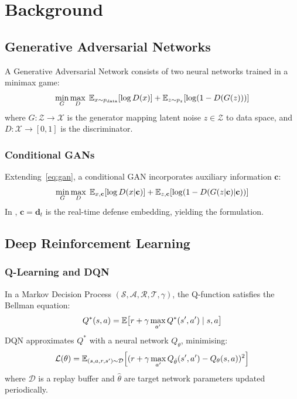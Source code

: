\chapter{Background}
\label{ch:background}

\section{Generative Adversarial Networks}

A Generative Adversarial Network \citep{goodfellow2014} consists of two
neural networks trained in a minimax game:
\begin{equation}
  \min_G \max_D\; \mathbb{E}_{x \sim p_{\mathrm{data}}}[\log D(x)]
    + \mathbb{E}_{z \sim p_z}[\log(1 - D(G(z)))]
  \label{eq:gan}
\end{equation}
where $G: \mathcal{Z} \to \mathcal{X}$ is the generator mapping latent noise
$z \in \mathcal{Z}$ to data space, and $D: \mathcal{X} \to [0,1]$ is the
discriminator.

\subsection{Conditional GANs}
Extending~\eqref{eq:gan}, a conditional GAN \citep{mirza2014} incorporates
auxiliary information $\mathbf{c}$:
\begin{equation}
  \min_G \max_D\; \mathbb{E}_{x,\mathbf{c}}[\log D(x|\mathbf{c})]
    + \mathbb{E}_{z,\mathbf{c}}[\log(1 - D(G(z|\mathbf{c})|\mathbf{c}))]
\end{equation}
In \caesar{}, $\mathbf{c} = \mathbf{d}_t$ is the real-time defense embedding,
yielding the \tagan{} formulation.

\section{Deep Reinforcement Learning}

\subsection{Q-Learning and DQN}
In a Markov Decision Process $(\mathcal{S}, \mathcal{A}, \mathcal{R},
\mathcal{T}, \gamma)$, the Q-function satisfies the Bellman equation:
\begin{equation}
  Q^*(s,a) = \mathbb{E}\bigl[r + \gamma \max_{a'} Q^*(s',a') \mid s,a\bigr]
\end{equation}
DQN \citep{mnih2015} approximates $Q^*$ with a neural network $Q_\theta$,
minimising:
\begin{equation}
  \mathcal{L}(\theta) = \mathbb{E}_{(s,a,r,s') \sim \mathcal{D}}
    \Bigl[(r + \gamma \max_{a'} Q_{\hat\theta}(s',a') - Q_\theta(s,a))^2\Bigr]
\end{equation}
where $\mathcal{D}$ is a replay buffer and $\hat\theta$ are target network
parameters updated periodically.

